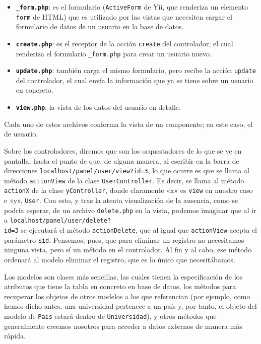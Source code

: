 \begin{itemize}
	\item \textbf{\texttt{\_form.php}}: es el formulario (\texttt{ActiveForm} de Yii, que renderiza un elemento \texttt{form} de HTML) que es utilizado por las vistas que necesiten cargar el formulario de datos de un usuario en la base de datos.
	\item \textbf{\texttt{create.php}}: es el receptor de la acción \texttt{create} del controlador, el cual renderiza el formulario \texttt{\_form.php} para crear un usuario nuevo.
	\item \textbf{\texttt{update.php}}: también carga el mismo formulario, pero recibe la acción \texttt{update} del controlador, el cual envía la información que ya se tiene sobre un usuario en concreto.
	\item \textbf{\texttt{view.php}}: la vista de los datos del usuario en detalle.
\end{itemize}

Cada uno de estos archivos conforma la vista de un componente; en este caso, el de usuario.

Sobre los controladores, diremos que son los orquestadores de lo que se ve en pantalla, hasta el punto de que, de alguna manera, al escribir en la barra de direcciones \texttt{localhost/panel/user/view?id=3}, lo que ocurre es que se llama al método \texttt{actionView} de la clase \texttt{UserController}. Es decir, se llama al método \texttt{actionX} de la clase \texttt{yController}, donde claramente «x» es \texttt{view} en nuestro caso e «y», \texttt{User}. Con esto, y tras la atenta visualización de la ausencia, como se podría esperar, de un archivo \texttt{delete.php} en la vista, podemos imaginar que al ir a \texttt{localhost/panel/user/delete?\\id=3} se ejecutará el método \texttt{actionDelete}, que al igual que \texttt{actionView} acepta el parámetro \texttt{\$id}. Pensemos, pues, que para eliminar un registro no necesitamos ninguna vista, pero sí un método en el controlador. Al fin y al cabo, ese método ordenará al modelo eliminar el registro, que es lo único que necesitábamos.

Los modelos son clases más sencillas, las cuales tienen la especificación de los atributos que tiene la tabla en concreto en base de datos, los métodos para recuperar los objetos de otros modelos a los que referencian (por ejemplo, como hemos dicho antes, una universidad pertenece a un país y, por tanto, el objeto del modelo de \texttt{Pais} estará dentro de \texttt{Universidad}), y otros métodos que generalmente creemos nosotros para acceder a datos externos de manera más rápida.

